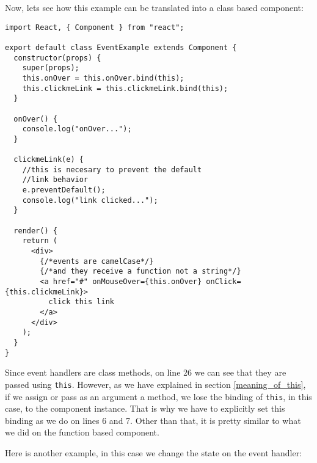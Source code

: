 \documentclass[a4paper, oneside, titlepage, 12pt]{book}
\begin{document}
Now, lets see how this example can be translated into a class based component:

\begin{verbatim}
import React, { Component } from "react";

export default class EventExample extends Component {
  constructor(props) {
    super(props);
    this.onOver = this.onOver.bind(this);
    this.clickmeLink = this.clickmeLink.bind(this);
  }

  onOver() {
    console.log("onOver...");
  }

  clickmeLink(e) {
    //this is necesary to prevent the default
    //link behavior
    e.preventDefault();
    console.log("link clicked...");
  }

  render() {
    return (
      <div>
        {/*events are camelCase*/}
        {/*and they receive a function not a string*/}
        <a href="#" onMouseOver={this.onOver} onClick={this.clickmeLink}>
          click this link
        </a>
      </div>
    );
  }
}
\end{verbatim}

Since event handlers are class methods, on line 26 we can see that they are passed using \texttt{this}. However, as we have explained in section \ref{meaning_of_this}, if we assign or pass as an argument a method, we lose the binding of \texttt{this}, in this case, to the component instance. That is why we have to explicitly set this binding as we do on lines 6 and 7. Other than that, it is pretty similar to what we did on the function based component. 
\newline

Here is another example, in this case we change the state on the event handler:
\end{document}
